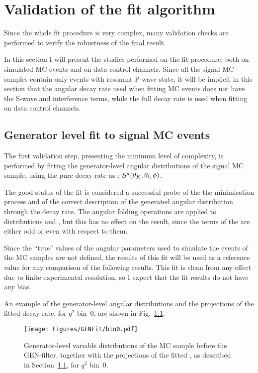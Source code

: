 \chapter{Validation of the fit algorithm}
\label{sec:validation}

Since the whole fit procedure is very complex, many validation checks are performed to verify the robustness of the final result.

In this section I will present the studies performed on the fit procedure, both on simulated MC events and on data control channels.
Since all the signal MC samples contain only events with resonant P-wave \PKpi state, it will be implicit in this section that the angular decay rate used when fitting MC events does not have the S-wave and interference terms, while the full decay rate is used when fitting on data control channels.

\section{Generator level fit to signal MC events}
\label{sec:fitval-gen}

The first validation step, presenting the minimum level of complexity, is performed by fitting the generator-level angular distributions of the signal MC sample, using the pure decay rate as \pdf: $S^a(\theta_K,\theta_l,\phi)$.

The good status of the fit is considered a successful probe of the the minimisation process and of the correct description of the generated angular distribution through the decay rate.
The angular folding operations are applied to distributions and \pdfs, but this has no effect on the result, since the terms of the \pdf are either odd or even with respect to them.

Since the ``true'' values of the angular parameters used to simulate the events of the MC samples are not defined, the results of this fit will be used as a reference value for any comparison of the following results.
This fit is clean from any effect due to finite experimental resolution, so I expect that the fit results do not have any bias.

An example of the generator-level angular distributions and the projections of the fitted decay rate, for $q^2$ bin~0, are shown in Fig.~\ref{fig:gen-bin0}.

\begin{figure}[!hbt]
  \centering
  \texttt{[image: Figures/GENFit/bin0.pdf]}
  \caption{Generator-level variable distributions of the MC sample before the GEN-filter, together with the projections of the fitted \pdf, as described in Section~\ref{sec:fitval-gen}, for $q^2$ bin~0.}
  \label{fig:gen-bin0}
\end{figure}

